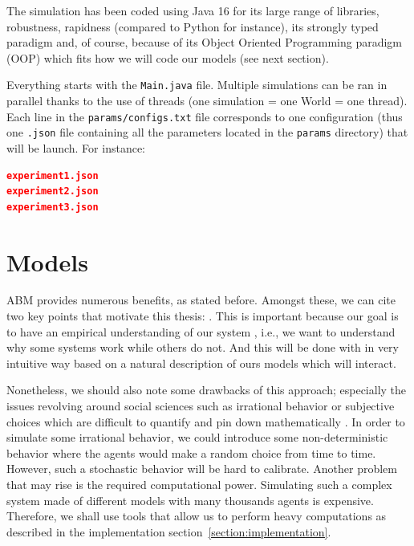     The simulation has been coded using Java 16 for its large range of libraries, robustness, rapidness (compared to Python for instance), its strongly typed paradigm and, of course, because of its Object Oriented Programming paradigm (OOP) which fits how we will code our models (see next section). 

    Everything starts with the \texttt{Main.java} file. Multiple simulations can be ran in parallel thanks to the use of threads (one simulation = one World = one thread). Each line in the \texttt{params/configs.txt} file corresponds to one configuration (thus one \texttt{.json} file containing all the parameters located in the \texttt{params} directory) that will be launch. For instance:

    \begin{lstlisting}[language=json,firstnumber=1]
experiment1.json
experiment2.json
experiment3.json
    \end{lstlisting}



\section{Models}\label{section:models}

ABM provides numerous benefits, as stated before. Amongst these, we can cite two key points that motivate this thesis: . This is important because our goal is to have an empirical understanding of our system \cite{tesfatsion_handbook}, i.e., we want to understand why some systems work while others do not. And this will be done with in very intuitive way based on a natural description of ours models which will interact.

Nonetheless, we should also note some drawbacks of this approach; especially the issues revolving around social sciences such as irrational behavior or subjective choices which are difficult to quantify and pin down mathematically \cite{ABM}. In order to simulate some irrational behavior, we could introduce some non-deterministic behavior where the agents would make a random choice from time to time. However, such a stochastic behavior will be hard to calibrate. 
Another problem that may rise is the required computational power. Simulating such a complex system made of different models with many thousands agents is expensive. Therefore, we shall use tools that allow us to perform heavy computations as described in the implementation section~\ref{section:implementation}. 

